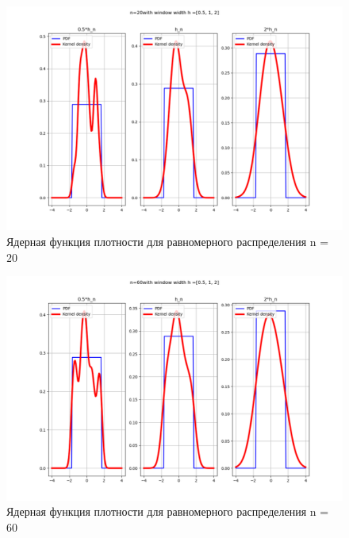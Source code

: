 \documentclass[a4]{article}
\begin{document}
\begin{center}
	\begin{figure}[H]
		\caption{ Ядерная функция плотности для равномерного распределения n = $20$}
		\includegraphics[width=\textwidth]{Lab4_uniform_pdf_20.png} 
	\end{figure}
	
	\begin{figure}[H]
		\caption{ Ядерная функция плотности для равномерного распределения n = $60$}
		\includegraphics[width=\textwidth]{Lab4_uniform_pdf_60.png} 
	\end{figure}
	

\end{center}
\end{document}
